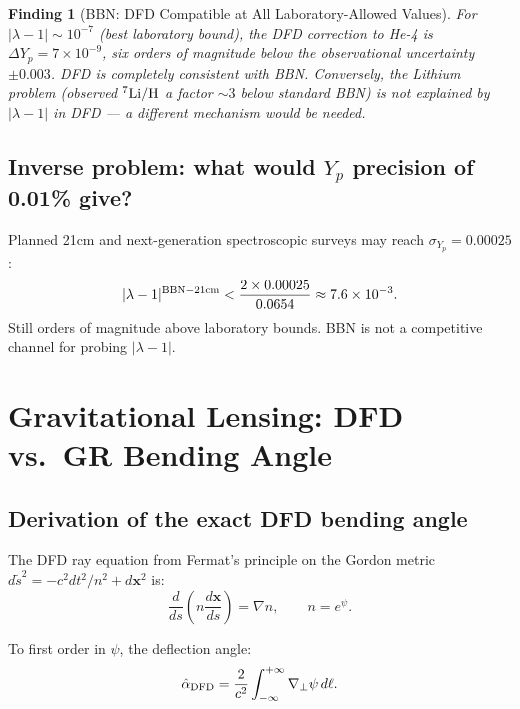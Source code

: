 \documentclass[11pt]{article}
\newtheorem{finding}{Finding}
\newcommand{\ee}[1]{\times 10^{#1}}
\newcommand{\lambdaone}{|\lambda-1|}
\begin{document}
\begin{finding}[BBN: DFD Compatible at All Laboratory-Allowed Values]
For $\lambdaone \sim 10^{-7}$ (best laboratory bound), the DFD correction
to He-4 is $\Delta Y_p = 7\ee{-9}$, six orders of magnitude below the
observational uncertainty $\pm 0.003$.  DFD is completely consistent
with BBN.  Conversely, the Lithium problem (observed $^7{\rm Li}/{\rm H}$
a factor $\sim 3$ below standard BBN) is not explained by $\lambdaone$
in DFD --- a different mechanism would be needed.
\end{finding}

\subsection{Inverse problem: what would $Y_p$ precision of 0.01\% give?}

Planned 21cm and next-generation spectroscopic surveys may reach
$\sigma_{Y_p} = 0.00025$:
\begin{equation}
  \lambdaone^{\rm BBN-21cm} < \frac{2 \times 0.00025}{0.0654} \approx 7.6\ee{-3}.
\end{equation}
Still orders of magnitude above laboratory bounds.  BBN is not a
competitive channel for probing $\lambdaone$.

\section{Gravitational Lensing: DFD vs.\ GR Bending Angle}
\label{sec:lensing}

\subsection{Derivation of the exact DFD bending angle}

The DFD ray equation from Fermat's principle on the Gordon metric
$d\tilde s^2 = -c^2dt^2/n^2 + d\mathbf{x}^2$ is:
\begin{equation}
  \frac{d}{ds}\left(n\frac{d\mathbf{x}}{ds}\right) = \nabla n,
  \qquad n = e^\psi.
\end{equation}

To first order in $\psi$, the deflection angle:
\begin{equation}
  \hat\alpha_{\rm DFD} = \frac{2}{c^2}\int_{-\infty}^{+\infty}
  \nabla_\perp\psi\,d\ell.
\end{equation}
\end{document}
